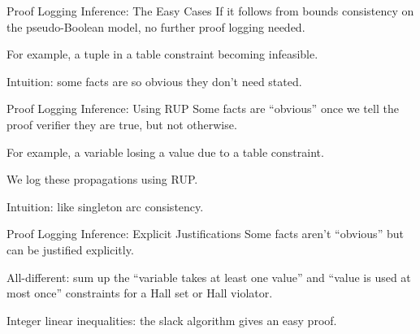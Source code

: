 \documentclass[aspectratio=169,compress,10pt]{beamer}
\begin{document}
\begin{frame}{Proof Logging Inference: The Easy Cases}
    If it follows from bounds consistency on the pseudo-Boolean model,
    no further proof logging needed.

    \bigskip

    For example, a tuple in a table constraint becoming infeasible.

    \bigskip

    Intuition: some facts are so obvious they don't need stated.
\end{frame}

\begin{frame}{Proof Logging Inference: Using RUP}
    Some facts are ``obvious'' once we tell the proof verifier they are true,
    but not otherwise.

    \bigskip

    For example, a variable losing a value due to a table constraint.

    \bigskip

    We log these propagations using RUP.

    \bigskip

    Intuition: like singleton arc consistency.
\end{frame}

\begin{frame}{Proof Logging Inference: Explicit Justifications}
    Some facts aren't ``obvious'' but can be justified explicitly.

    \bigskip

    All-different: sum up the ``variable takes at least one value'' and ``value is used at most once'' constraints for a Hall set or Hall violator.

    \bigskip

    Integer linear inequalities: the slack algorithm gives an easy proof.
\end{frame}
\end{document}
